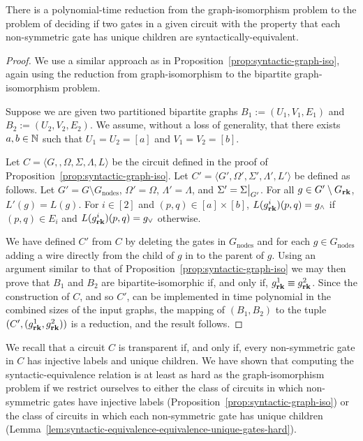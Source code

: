 \documentclass[../paper.tex]{subfiles}
\begin{document}
\begin{lem}
  There is a polynomial-time reduction from the graph-isomorphism problem to the
  problem of deciding if two gates in a given circuit with the property that
  each non-symmetric gate has unique children are syntactically-equivalent.
  \label{lem:syntactic-equivalence-unique-gates-hard}
\end{lem}
\begin{proof}
  We use a similar approach as in Proposition~\ref{prop:syntactic-graph-iso},
  again using the reduction from graph-isomorphism to the bipartite
  graph-isomorphism problem.
  
  Suppose we are given two partitioned bipartite graphs $B_1 := (U_1, V_1, E_1)$
  and $B_2 := (U_2, V_2, E_2)$. We assume, without a loss of generality, that
  there exists $a, b \in \mathbb{N}$ such that $U_1 = U_2 = [a]$ and $V_1 = V_2 =
  [b]$.

  Let $C = \langle G, , \Omega, \Sigma, \Lambda, L \rangle$ be the circuit
  defined in the proof of Proposition~\ref{prop:syntactic-graph-iso}. Let $C' =
  \langle G', \Omega', \Sigma', \Lambda', L'\rangle$ be defined as follows. Let
  $G' = G \setminus G_{\text{nodes}}$, $\Omega' = \Omega$, $\Lambda' = \Lambda$,
  and $\Sigma' = \restr{\Sigma}{G'}$. For all $g \in G' \setminus G_{\text{\textbf{rk}}}$,
  $L'(g) = L(g)$. For $i \in [2]$ and $(p,q) \in [a] \times [b]$,
  $L(g^i_{\text{\textbf{rk}}})(p,q) = g_{\land}$ if $(p,q) \in E_i$ and $L(g^i_{\text{\textbf{rk}}})(p,q)
  = g_{\lor}$ otherwise.

  We have defined $C'$ from $C$ by deleting the gates in $G_{\text{nodes}}$ and
  for each $g \in G_{\text{nodes}}$ adding a wire directly from the child of $g$
  in to the parent of $g$. Using an argument similar to that of
  Proposition~\ref{prop:syntactic-graph-iso} we may then prove that $B_1$ and
  $B_2$ are bipartite-isomorphic if, and only if, $g^1_{\text{\textbf{rk}}} \equiv
  g^2_{\text{\textbf{rk}}}$. Since the construction of $C$, and so $C'$, can be implemented
  in time polynomial in the combined sizes of the input graphs, the mapping of
  $(B_1, B_2)$ to the tuple $(C', (g^1_{\text{\textbf{rk}}}, g^2_{\text{\textbf{rk}}}))$ is a reduction,
  and the result follows.
\end{proof}

We recall that a circuit $C$ is transparent if, and only if, every non-symmetric
gate in $C$ has injective labels and unique children. We have shown that
computing the syntactic-equivalence relation is at least as hard as the
graph-isomorphism problem if we restrict ourselves to either the class of
circuits in which non-symmetric gates have injective labels
(Proposition~\ref{prop:syntactic-graph-iso}) or the class of circuits in which
each non-symmetric gate has unique children
(Lemma~\ref{lem:syntactic-equivalence-equivalence-unique-gates-hard}).
\end{document}
